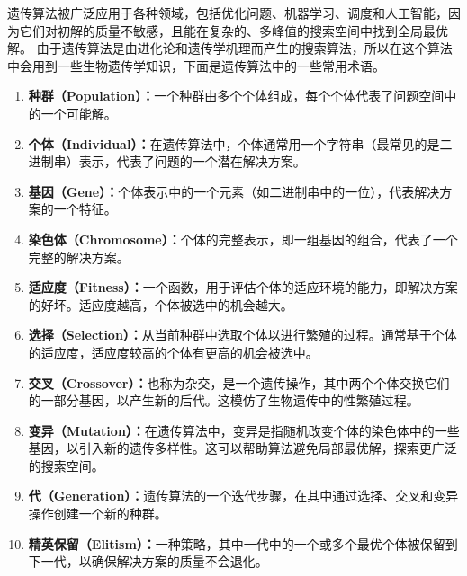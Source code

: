 遗传算法被广泛应用于各种领域，包括优化问题、机器学习、调度和人工智能，因为它们对初解的质量不敏感，且能在复杂的、多峰值的搜索空间中找到全局最优解。
由于遗传算法是由进化论和遗传学机理而产生的搜索算法，所以在这个算法中会用到一些生物遗传学知识，下面是遗传算法中的一些常用术语。
\begin{enumerate}
  \item \textbf{种群（Population）：}一个种群由多个个体组成，每个个体代表了问题空间中的一个可能解。

  \item \textbf{个体（Individual）：}在遗传算法中，个体通常用一个字符串（最常见的是二进制串）表示，代表了问题的一个潜在解决方案。
  
  \item \textbf{基因（Gene）：}个体表示中的一个元素（如二进制串中的一位），代表解决方案的一个特征。
  
  \item \textbf{染色体（Chromosome）：}个体的完整表示，即一组基因的组合，代表了一个完整的解决方案。
  
  \item \textbf{适应度（Fitness）：}一个函数，用于评估个体的适应环境的能力，即解决方案的好坏。适应度越高，个体被选中的机会越大。
  
  \item \textbf{选择（Selection）：}从当前种群中选取个体以进行繁殖的过程。通常基于个体的适应度，适应度较高的个体有更高的机会被选中。
  
  \item \textbf{交叉（Crossover）：}也称为杂交，是一个遗传操作，其中两个个体交换它们的一部分基因，以产生新的后代。这模仿了生物遗传中的性繁殖过程。
  
  \item \textbf{变异（Mutation）：}在遗传算法中，变异是指随机改变个体的染色体中的一些基因，以引入新的遗传多样性。这可以帮助算法避免局部最优解，探索更广泛的搜索空间。
  
  \item \textbf{代（Generation）：}遗传算法的一个迭代步骤，在其中通过选择、交叉和变异操作创建一个新的种群。
  
  \item \textbf{精英保留（Elitism）：}一种策略，其中一代中的一个或多个最优个体被保留到下一代，以确保解决方案的质量不会退化。
  \end{enumerate}